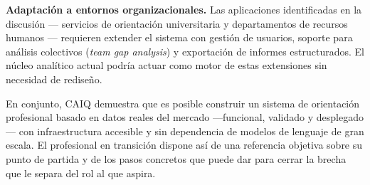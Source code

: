 \textbf{Adaptación a entornos organizacionales.} Las aplicaciones identificadas en la
discusión --- servicios de orientación universitaria y departamentos de recursos humanos ---
requieren extender el sistema con gestión de usuarios, soporte para análisis colectivos
(\textit{team gap analysis}) y exportación de informes estructurados. El núcleo analítico
actual podría actuar como motor de estas extensiones sin necesidad de rediseño.

En conjunto, CAIQ demuestra que es posible construir un sistema de orientación profesional basado en datos reales del mercado ---funcional, validado y desplegado--- con infraestructura accesible y sin dependencia de modelos de lenguaje de gran escala. El profesional en transición dispone así de una referencia objetiva sobre su punto de partida y de los pasos concretos que puede dar para cerrar la brecha que le separa del rol al que aspira.
